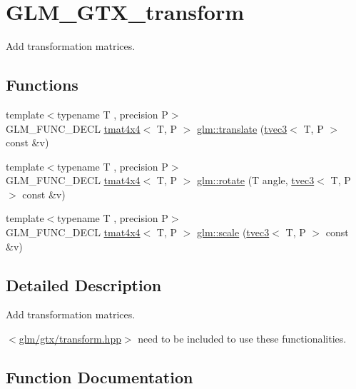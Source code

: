 \hypertarget{group__gtx__transform}{}\section{G\+L\+M\+\_\+\+G\+T\+X\+\_\+transform}
\label{group__gtx__transform}


Add transformation matrices.  


\subsection*{Functions}
\begin{DoxyCompactItemize}
\item 
{\footnotesize template$<$typename T , precision P$>$ }\\G\+L\+M\+\_\+\+F\+U\+N\+C\+\_\+\+D\+E\+CL \hyperlink{structglm_1_1tmat4x4}{tmat4x4}$<$ T, P $>$ \hyperlink{group__gtx__transform_ga838c4505ef7f254ed05117b1ac9691fb}{glm\+::translate} (\hyperlink{structglm_1_1tvec3}{tvec3}$<$ T, P $>$ const \&v)
\item 
{\footnotesize template$<$typename T , precision P$>$ }\\G\+L\+M\+\_\+\+F\+U\+N\+C\+\_\+\+D\+E\+CL \hyperlink{structglm_1_1tmat4x4}{tmat4x4}$<$ T, P $>$ \hyperlink{group__gtx__transform_ga2020c91bf61e050882b3a5c18eada700}{glm\+::rotate} (T angle, \hyperlink{structglm_1_1tvec3}{tvec3}$<$ T, P $>$ const \&v)
\item 
{\footnotesize template$<$typename T , precision P$>$ }\\G\+L\+M\+\_\+\+F\+U\+N\+C\+\_\+\+D\+E\+CL \hyperlink{structglm_1_1tmat4x4}{tmat4x4}$<$ T, P $>$ \hyperlink{group__gtx__transform_ga1972d4a66a2e92637c8aaee598417a71}{glm\+::scale} (\hyperlink{structglm_1_1tvec3}{tvec3}$<$ T, P $>$ const \&v)
\end{DoxyCompactItemize}


\subsection{Detailed Description}
Add transformation matrices. 

$<$\hyperlink{transform_8hpp}{glm/gtx/transform.\+hpp}$>$ need to be included to use these functionalities. 

\subsection{Function Documentation}
\mbox{\label{group__gtx__transform_ga2020c91bf61e050882b3a5c18eada700}} 
